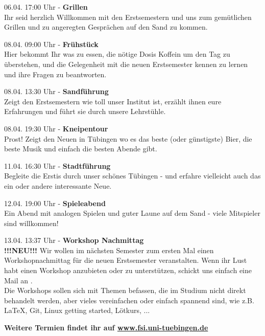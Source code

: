 \large 06.04. 17:00 Uhr - \textbf{Grillen}\\
\normalsize
Ihr seid herzlich Willkommen mit den Erstsemestern und uns zum gemütlichen Grillen und zu angeregten Gesprächen auf den Sand zu kommen.

\large 08.04. 09:00 Uhr - \textbf{Frühstück}\\
\normalsize
Hier bekommt Ihr was zu essen, die nötige Dosis Koffein um den Tag zu überstehen, und die Gelegenheit mit die neuen Erstsemester kennen zu lernen  und ihre Fragen zu beantworten.

\large 08.04. 13:30 Uhr - \textbf{Sandführung}\\
\normalsize
Zeigt den Erstsemestern wie toll unser Institut ist, erzählt ihnen eure Erfahrungen und führt sie durch unsere Lehrstühle.

\large 08.04. 19:30 Uhr - \textbf{Kneipentour}\\
\normalsize
Prost! Zeigt den Neuen in Tübingen wo es das beste (oder günstigste) Bier, die beste Musik und einfach die besten Abende gibt. 

\large 11.04. 16:30 Uhr - \textbf{Stadtführung}\\
\normalsize
Begleite die Erstis durch unser schönes Tübingen - und erfahre vielleicht auch das ein oder andere interessante Neue.

\large 12.04. 19:00 Uhr - \textbf{Spieleabend}\\
\normalsize
Ein Abend mit analogen Spielen und guter Laune auf dem Sand - viele Mitspieler sind willkommen!

\large 13.04. 13:37 Uhr - \textbf{Workshop Nachmittag}\\
\normalsize
\textbf{!!!NEU!!!} 	Wir wollen im nächsten Semester zum ersten Mal einen Workshopnachmittag für die neuen Erstsemester veranstalten. Wenn ihr Lust habt einen Workshop anzubieten oder zu unterstützen, schickt uns einfach eine Mail an .\\
Die Workshops sollen sich mit Themen befassen, die im Studium nicht direkt behandelt werden, aber vieles vereinfachen oder einfach spannend sind, wie z.B. \LaTeX, Git, Linux getting started, Lötkurs, ... 

\vfill
\centering \large \textbf{Weitere Termien findet ihr auf \url{www.fsi.uni-tuebingen.de}}

